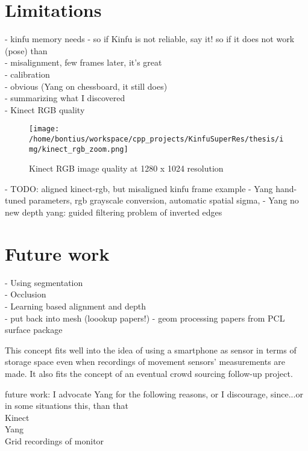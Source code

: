 \documentclass{ucl_thesis}
\begin{document}
\section{Limitations} 
\label{sec:limitations}
	- kinfu memory needs
	- so if Kinfu is not reliable, say it! so if it does not work (pose) than \citep{Whelan13icra} \\
	- misalignment, few frames later, it's great \\
	- calibration \\
    - obvious (Yang on chessboard, it still does) \\
    - summarizing what I discovered \\
    - Kinect RGB quality \\
    \begin{figure}[h!]\centering
        \texttt{[image: /home/bontius/workspace/cpp\_projects/KinfuSuperRes/thesis/img/kinect\_rgb\_zoom.png]}
        \caption{Kinect RGB image quality at 1280 x 1024 resolution}
        \label{fig:kinect_rgb_zoom}
    \end{figure}
    - TODO: aligned kinect-rgb, but misaligned kinfu frame example
    - Yang hand-tuned parameters, rgb grayscale conversion, automatic spatial sigma, 
    - Yang no new depth
yang:     guided filtering problem of inverted edges
    
\section{Future work}
\label{sec:future_work}

- Using segmentation \citep{Silberman:ECCV12} \\
- Occlusion \citep{Hoiem:2011} \\
- Learning based alignment and depth \citep{Herrera:LearnedJointMRF} \\
- put back into mesh (loookup papers!)
- geom processing papers from PCL surface package

This concept fits well into the idea of using a smartphone as sensor in terms of storage space even when recordings of movement sensors' measurements are made. It also fits the concept of an eventual crowd sourcing follow-up project. 

future work: I advocate Yang for the following reasons, or I discourage, since...or in some situations this, than that \\
Kinect \\
Yang \\
Grid recordings of monitor\\
\end{document}
